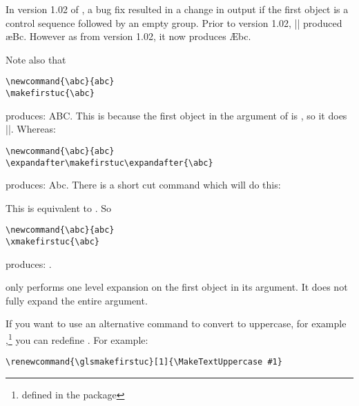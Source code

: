 \documentclass{nlctdoc}
\begin{document}
\begin{important}
In version 1.02 of , a bug fix resulted in a change
in output if the first object is a control sequence followed by
an empty group. Prior to version 1.02, ||
produced \ae Bc. However as from version 1.02, it now produces
\AE bc.
\end{important}

Note also that
\begin{verbatim}
\newcommand{\abc}{abc}
\makefirstuc{\abc}
\end{verbatim}
produces: ABC. This is because the first object in the argument of
 is , so it does |\MakeUppercase{\abc}|.
Whereas:
\begin{verbatim}
\newcommand{\abc}{abc}
\expandafter\makefirstuc\expandafter{\abc}
\end{verbatim}
produces: Abc. There is a short cut command which will do this:
\begin{definition}[\DescribeMacro{\xmakefirstuc}]
\end{definition}
This is equivalent to . So
\begin{verbatim}
\newcommand{\abc}{abc}
\xmakefirstuc{\abc}
\end{verbatim}
produces: 
\newcommand{\abc}{abc}%
\xmakefirstuc{\abc}.

\begin{important}
 only performs one level expansion on the first
object in its argument. It does not fully expand the entire
argument.
\end{important}

If you want to use an alternative command to convert to uppercase,
for example ,\footnote{defined in the 
 package} you can redefine . 
For example:
\begin{verbatim}
\renewcommand{\glsmakefirstuc}[1]{\MakeTextUppercase #1}
\end{verbatim}
\end{document}
